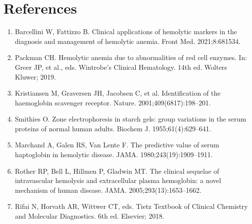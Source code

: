 \section*{References}
\begin{enumerate}
  \item Barcellini W, Fattizzo B. Clinical applications of hemolytic markers in the diagnosis and management of hemolytic anemia. Front Med. 2021;8:681534.
  \item Packman CH. Hemolytic anemia due to abnormalities of red cell enzymes. In: Greer JP, et al., eds. Wintrobe's Clinical Hematology. 14th ed. Wolters Kluwer; 2019.
  \item Kristiansen M, Graversen JH, Jacobsen C, et al. Identification of the haemoglobin scavenger receptor. Nature. 2001;409(6817):198--201.
  \item Smithies O. Zone electrophoresis in starch gels: group variations in the serum proteins of normal human adults. Biochem J. 1955;61(4):629--641.
  \item Marchand A, Galen RS, Van Lente F. The predictive value of serum haptoglobin in hemolytic disease. JAMA. 1980;243(19):1909--1911.
  \item Rother RP, Bell L, Hillmen P, Gladwin MT. The clinical sequelae of intravascular hemolysis and extracellular plasma hemoglobin: a novel mechanism of human disease. JAMA. 2005;293(13):1653--1662.
  \item Rifai N, Horvath AR, Wittwer CT, eds. Tietz Textbook of Clinical Chemistry and Molecular Diagnostics. 6th ed. Elsevier; 2018.
\end{enumerate}
\clearpage
